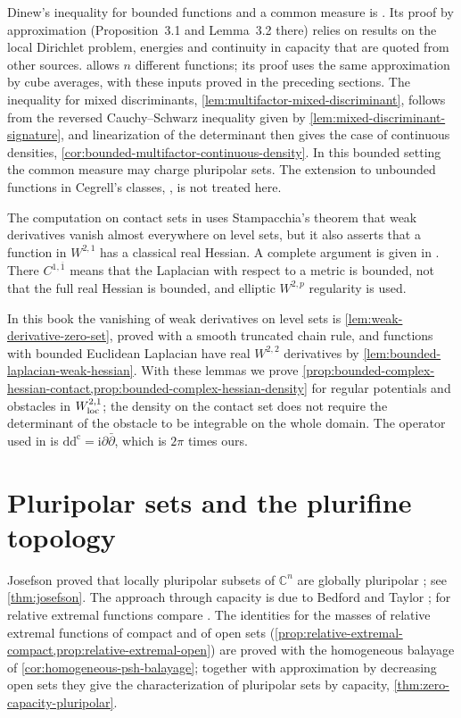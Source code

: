 Dinew's inequality for bounded functions and a common measure is \cite[Theorem 3.3]{Din07MixedV1}. Its proof by approximation (Proposition~3.1 and Lemma~3.2 there) relies on results on the local Dirichlet problem, energies and continuity in capacity that are quoted from other sources.  allows $n$ different functions; its proof uses the same approximation by cube averages, with these inputs proved in the preceding sections. The inequality for mixed discriminants, \cref{lem:multifactor-mixed-discriminant}, follows from the reversed Cauchy--Schwarz inequality given by \cref{lem:mixed-discriminant-signature}, and linearization of the determinant then gives the case of continuous densities, \cref{cor:bounded-multifactor-continuous-density}. In this bounded setting the common measure may charge pluripolar sets. The extension to unbounded functions in Cegrell's classes, \cite[Theorem~3.4]{Din07MixedV1}, is not treated here.

The computation on contact sets in \cite[Lemma 2.4.7, Step 1]{XiaSampleBook} uses Stampacchia's theorem that weak derivatives vanish almost everywhere on level sets, but it also asserts that a function in $W^{2,1}$ has a classical real Hessian. A complete argument is given in \cite[Lemma 3.1 and Theorem 3.2]{DNT2019v1}. There $C^{1,\overline1}$ means that the Laplacian with respect to a metric is bounded, not that the full real Hessian is bounded, and elliptic $W^{2,p}$ regularity is used.

In this book the vanishing of weak derivatives on level sets is \cref{lem:weak-derivative-zero-set}, proved with a smooth truncated chain rule, and functions with bounded Euclidean Laplacian have real $W^{2,2}$ derivatives by \cref{lem:bounded-laplacian-weak-hessian}. With these lemmas we prove \cref{prop:bounded-complex-hessian-contact,prop:bounded-complex-hessian-density} for regular potentials and obstacles in $W^{2,1}_{\mathrm{loc}}$; the density on the contact set does not require the determinant of the obstacle to be integrable on the whole domain. The operator used in \cite{DNT2019v1} is $\mathrm{dd^c}=\mathrm i\partial\bar\partial$, which is $2\pi$ times ours.

\section{Pluripolar sets and the plurifine topology}
\label{sec:history-pluripolar}
Josefson proved that locally pluripolar subsets of $\mathbb C^n$ are globally pluripolar \cite{Jos78}; see \cref{thm:josefson}. The approach through capacity is due to Bedford and Taylor \cite{BT82}; for relative extremal functions compare \cite[Theorem 4.32, Theorem 4.34, and Theorem 4.40 and Corollary 4.41]{GZ17}. The identities for the masses of relative extremal functions of compact and of open sets (\cref{prop:relative-extremal-compact,prop:relative-extremal-open}) are proved with the homogeneous balayage of \cref{cor:homogeneous-psh-balayage}; together with approximation by decreasing open sets they give the characterization of pluripolar sets by capacity, \cref{thm:zero-capacity-pluripolar}.

